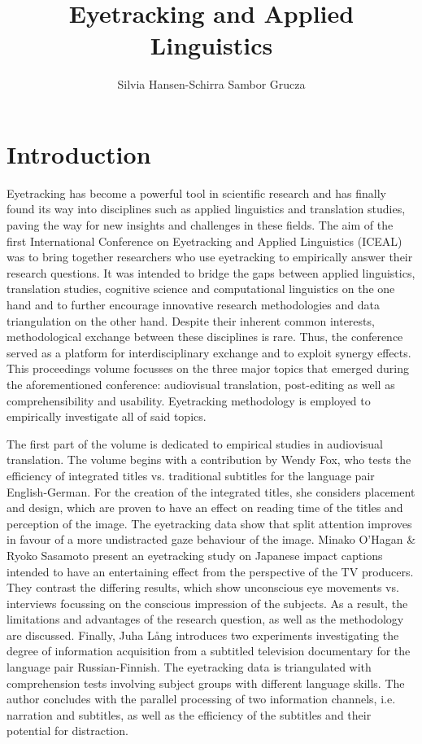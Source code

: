 \documentclass[output=paper]{langsci/langscibook}
\author{%
Silvia Hansen-Schirra\affiliation{Johannes Gutenberg University of Mainz in Germersheim}%
\lastand
Sambor Grucza \affiliation{University of Warsaw}
}
\title{Eyetracking and Applied Linguistics}
\begin{document}
\section{Introduction}

Eyetracking has become a powerful tool in scientific research and has finally found its way into disciplines such as applied linguistics and translation studies, paving the way for new insights and challenges in these fields. The aim of the first International Conference on Eyetracking and Applied Linguistics (ICEAL) was to bring together researchers who use eyetracking to empirically answer their research questions. It was intended to bridge the gaps between applied linguistics, translation studies, cognitive science and computational linguistics on the one hand and to further encourage innovative research methodologies and data triangulation on the other hand. Despite their inherent common interests, methodological exchange between these disciplines is rare. Thus, the conference served as a platform for interdisciplinary exchange and to exploit synergy effects. This proceedings volume focusses on the three major topics that emerged during the aforementioned conference: audiovisual translation, post-editing as well as comprehensibility and usability. Eyetracking methodology is employed to empirically investigate all of said topics. 

The first part of the volume is dedicated to empirical studies in audiovisual translation. The volume begins with a contribution by Wendy Fox, who tests the efficiency of integrated titles vs. traditional subtitles for the language pair English-German. For the creation of the integrated titles, she considers placement and design, which are proven to have an effect on reading time of the titles and perception of the image. The eyetracking data show that split attention improves in favour of a more undistracted gaze behaviour of the image. Minako O’Hagan \& Ryoko Sasamoto present an eyetracking study on Japanese impact captions intended to have an entertaining effect from the perspective of the TV producers. They contrast the differing results, which show unconscious eye movements vs. interviews focussing on the conscious impression of the subjects. As a result, the limitations and advantages of the research question, as well as the methodology are discussed. Finally, Juha Lång introduces two experiments investigating the degree of information acquisition from a subtitled television documentary for the language pair Russian-Finnish. The eyetracking data is triangulated with comprehension tests involving subject groups with different language skills. The author concludes with the parallel processing of two information channels, i.e. narration and subtitles, as well as the efficiency of the subtitles and their potential for distraction.
\end{document}
